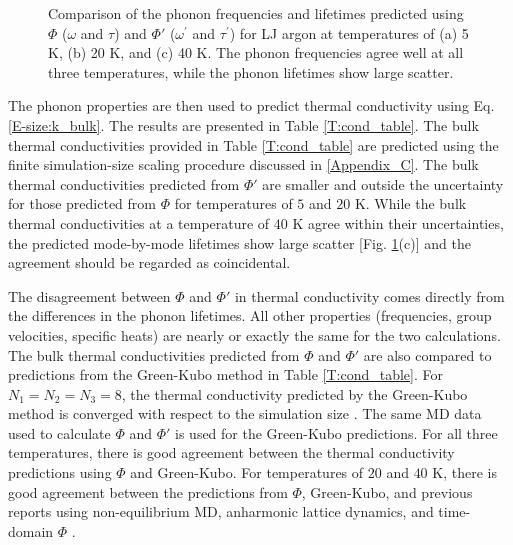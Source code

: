 \documentclass[12pt,twocolumn,iop]{/usr/share/texmf-texlive/tex/latex/iop/iopart}[/usr/share/texmf-texlive/tex/latex/iop/]
\begin{document}
\begin{figure}
\begin{center}
\end{center}
\caption{\label{F:FREQ_LIFE_LJ} Comparison of the phonon frequencies and lifetimes predicted using $\Phi$ ($\omega$ and $\tau$) and $\Phi'$ ($\omega^{'}$ and $\tau^{'}$) for LJ argon at temperatures of (a) 5 K, (b) 20 K, and (c) 40 K. The phonon frequencies agree well at all three temperatures, while the phonon lifetimes show large scatter.}
\end{figure}



The phonon properties are then used to predict thermal conductivity using Eq$.$ \eqref{E-size:k_bulk}. The results are presented in Table \ref{T:cond_table}. The bulk thermal conductivities provided in Table \ref{T:cond_table} are predicted using the finite simulation-size scaling procedure discussed in \ref{Appendix_C}. The bulk thermal conductivities predicted from $\Phi'$ are smaller and outside the uncertainty for those predicted from $\Phi$ for temperatures of $5$ and $20$ K. While the bulk thermal conductivities at a temperature of $40$ K agree within their uncertainties, the predicted mode-by-mode lifetimes show large scatter [Fig$.$ \ref{F:FREQ_LIFE_LJ}(c)] and the agreement should be regarded as coincidental.

The disagreement between $\Phi$ and $\Phi'$ in thermal conductivity comes directly from the differences in the phonon lifetimes. All other properties (frequencies, group velocities, specific heats) are nearly or exactly the same for the two calculations. The bulk thermal conductivities predicted from $\Phi$ and $\Phi'$ are also compared to predictions from the Green-Kubo method\cite{mcquarrie2000} in Table \ref{T:cond_table}. For $N_1=N_2=N_3=8$, the thermal conductivity predicted by the Green-Kubo method is converged with respect to the simulation size \cite{mcgaughey2004c}. The same MD data used to calculate $\Phi$ and $\Phi'$ is used for the Green-Kubo predictions. For all three temperatures, there is good agreement between the thermal conductivity predictions using $\Phi$ and Green-Kubo. For temperatures of $20$ and $40$ K, there is good agreement between the predictions from $\Phi$, Green-Kubo, and previous reports using non-equilibrium MD, anharmonic lattice dynamics, and time-domain $\Phi$ \cite{turney2009a}.
\end{document}
